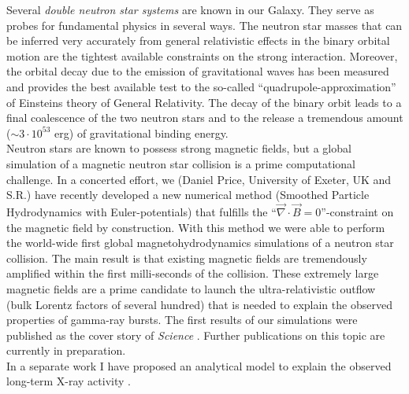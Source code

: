 Several {\em double neutron star systems} are known in our Galaxy.
They serve as
probes for fundamental physics in several ways. The neutron star
masses that can be inferred very accurately from general relativistic effects
in the binary orbital motion are the tightest available constraints on
the strong interaction. Moreover, the orbital decay due to the emission
of gravitational waves has been measured and provides the best available
test to the so-called ``quadrupole-approximation'' of Einsteins theory of
General
Relativity. The decay of the binary orbit leads to a final coalescence
of the two neutron stars and to the release a tremendous amount
($\sim 3\cdot 10^{53}$ erg) of gravitational binding energy.\\
Neutron stars are known to possess strong magnetic fields, but a global
simulation of a magnetic neutron star collision is a prime computational
challenge. In a concerted effort, we (Daniel Price, University of Exeter,
UK and S.R.) have recently developed a new numerical method
(Smoothed Particle Hydrodynamics  with Euler-potentials) that fulfills
the ``$\vec\nabla \cdot \vec{B}= 0$''-constraint on the magnetic field by
construction. With this method we were able to perform the world-wide first
global magnetohydrodynamics simulations of a neutron star collision. The main
result is that existing magnetic fields are tremendously amplified
within the first milli-seconds of the collision. These extremely large
magnetic fields are a prime candidate to launch the ultra-relativistic outflow
(bulk Lorentz factors of several hundred) that is needed to explain the
observed properties of gamma-ray bursts. The first results of our
simulations were published as the cover story of {\em Science}
\cite{Rosswog1}. Further publications on this topic are currently in
preparation.\\
In a separate work I have proposed an analytical model to explain the
observed long-term X-ray activity \cite{Rosswog2}.

